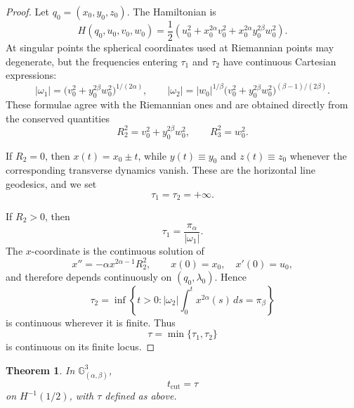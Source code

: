 \documentclass[12pt]{amsart}
\numberwithin{equation}{section}
\theoremstyle{plain}
\newtheorem{theorem}{Theorem}[section]
\theoremstyle{definition}
\theoremstyle{remark}
\begin{document}
\begin{proof}
    Let \(q_0=(x_0,y_0,z_0)\). The Hamiltonian is
    \[
        H(q_0,u_0,v_0,w_0)
        =
        \frac12
        \left(
        u_0^2+x_0^{2\alpha}v_0^2+x_0^{2\alpha}y_0^{2\beta}w_0^2
        \right).
    \]
    At singular points the spherical coordinates used at Riemannian points may degenerate,
    but the frequencies entering \(\tau_1\) and \(\tau_2\) have continuous Cartesian
    expressions:
    \begin{equation}\label{e.singular-frequencies}
        |\omega_1|
        =
        \bigl(v_0^2+y_0^{2\beta}w_0^2\bigr)^{1/(2\alpha)},
        \qquad
        |\omega_2|
        =
        |w_0|^{1/\beta}
        \bigl(v_0^2+y_0^{2\beta}w_0^2\bigr)^{(\beta-1)/(2\beta)}.
    \end{equation}
    These formulae agree with the Riemannian ones and are obtained directly from the
    conserved quantities
    \[
        R_2^2=v_0^2+y_0^{2\beta}w_0^2,
        \qquad
        R_3^2=w_0^2.
    \]

    If \(R_2=0\), then \(x(t)=x_0\pm t\), while \(y(t)\equiv y_0\) and
    \(z(t)\equiv z_0\) whenever the corresponding transverse dynamics vanish. These are the
    horizontal line geodesics, and we set
    \[
        \tau_1=\tau_2=+\infty.
    \]

    If \(R_2>0\), then
    \[
        \tau_1=\frac{\pi_\alpha}{|\omega_1|}.
    \]
    The \(x\)-coordinate is the continuous solution of
    \[
        x''=-\alpha x^{2\alpha-1}R_2^2,
        \qquad
        x(0)=x_0,\quad x'(0)=u_0,
    \]
    and therefore depends continuously on \((q_0,\lambda_0)\). Hence
    \[
        \tau_2
        =
        \inf\left\{
        t>0:
        |\omega_2|\int_0^t x^{2\alpha}(s)\,ds=\pi_\beta
        \right\}
    \]
    is continuous wherever it is finite. Thus
    \[
        \tau=\min\{\tau_1,\tau_2\}
    \]
    is continuous on its finite locus.
\end{proof}

\begin{theorem}\label{full optimal synth}
    In \(\mathbb G^3_{(\alpha,\beta)}\),
    \[
        t_{\operatorname{cut}}=\tau
    \]
    on \(H^{-1}(1/2)\), with \(\tau\) defined as above.
\end{theorem}
\end{document}
